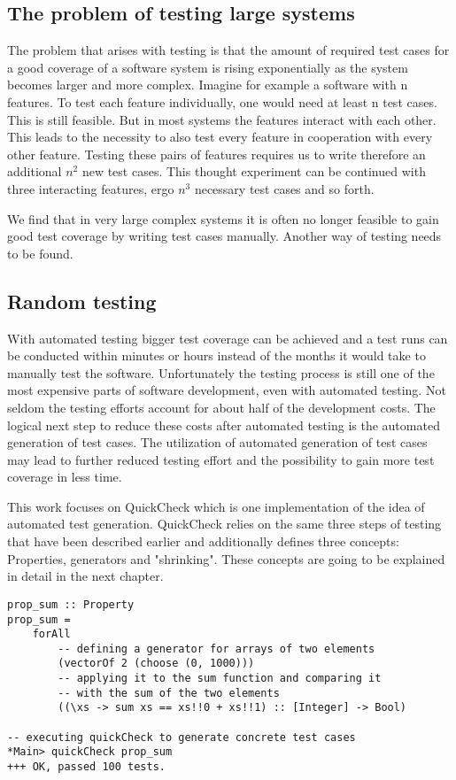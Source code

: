 \documentclass[a4paper, 12pt]{article} %
\begin{document}
\subsection{The problem of testing large systems}

The problem that arises with testing is that the amount of required test cases for a good coverage of a software system is rising exponentially as the system becomes larger and more complex. Imagine for example a software with n features. To test each feature individually, one would need at least n test cases. This is still feasible. But in most systems the features interact with each other. This leads to the necessity to also test every feature in cooperation with every other feature. Testing these pairs of features requires us to write therefore an additional $n^2$  new test cases. This thought experiment can be continued with three interacting features, ergo $n^3$ necessary test cases and so forth\cite{Hughes2016}.

We find that in very large complex systems it is often no longer feasible to gain good test coverage by writing test cases manually. Another way of testing needs to be found. 

\subsection{Random testing}

With automated testing bigger test coverage can be achieved and a test runs can be conducted within minutes or hours instead of the months it would take to manually test the software. Unfortunately the testing process is still one of the most expensive parts of software development, even with automated testing. Not seldom the testing efforts account for about half of the development costs\cite{Claessen2000}. The logical next step to reduce these costs after automated testing is the automated generation of test cases. The utilization of automated generation of test cases may lead to further reduced testing effort and the possibility to gain more test coverage in less time.

This work focuses on QuickCheck which is one implementation of the idea of automated test generation. QuickCheck relies on the same three steps of testing that have been described earlier and additionally defines three concepts: Properties, generators and "shrinking". These concepts are going to be explained in detail in the next chapter.

\begin{verbatim}
prop_sum :: Property
prop_sum = 
    forAll
        -- defining a generator for arrays of two elements
        (vectorOf 2 (choose (0, 1000)))
        -- applying it to the sum function and comparing it 
        -- with the sum of the two elements
        ((\xs -> sum xs == xs!!0 + xs!!1) :: [Integer] -> Bool)

-- executing quickCheck to generate concrete test cases
*Main> quickCheck prop_sum 
+++ OK, passed 100 tests.
\end{verbatim}
\end{document}
